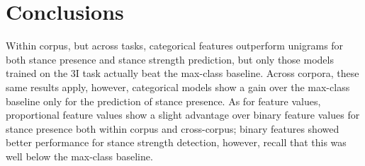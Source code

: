 \section{Conclusions} 

Within corpus, but across tasks, categorical features outperform unigrams for both stance presence and stance strength prediction, but only those models trained on the 3I task actually beat the max-class baseline. Across corpora, these same results apply, however, categorical models show a gain over the max-class baseline only for the prediction of stance presence.  As for feature values, proportional feature values show a slight advantage over binary feature values for stance presence both within corpus and cross-corpus; binary features showed better performance for stance strength detection, however, recall that this was well below the max-class baseline.  


